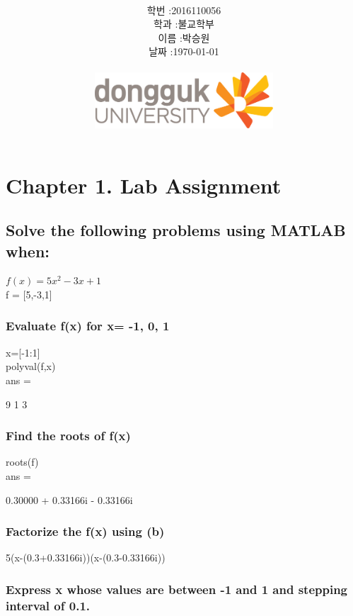 \documentclass[12pt,a4paper]{article}
\title{
	\centering
	\pgfornament[width=12cm,color=teal]{84}\\
	\vspace{1cm}
	\fontsize{50}{50} \selectfont {정보통신 수학 및 실습\\3월 3주차 Lab assignment}\\
		\pgfornament[width=12cm,color=teal]{88}\\
	\vfill}
\author{
	\LARGE
	\begin{tabular}{rl}
		\hline
		학번 : & 2016110056\\ 
		학과 : & 불교학부 \\
		이름 : & 박승원\\
		날짜 : & \today\\
		\hline
	\end{tabular}\vspace{1cm}
	\\
\includegraphics[width=0.5\textwidth]{logo.jpg}
	}
\date{}
\begin{document}
\maketitle
{}
\noindent
\lstset{language=matlab, columns=flexible, tabsize=4, frame=shadowbox, showstringspaces=false, breaklines=true, upquote=true, basicstyle=\normalsize}

\renewcommand{\thesubsubsection}{\alph{subsubsection})}
\renewcommand{\thesubsection}{\arabic{subsection}.}
\newpage
\section*{Chapter 1. Lab Assignment}

\subsection {Solve the following problems using MATLAB when:}
$f(x) = 5x^2-3x+1$\\
f = [5,-3,1]\\

\subsubsection{Evaluate f(x) for x= -1, 0, 1} 

x=[-1:1]\\
polyval(f,x)\\
ans =

9   1   3




\subsubsection{Find the roots of f(x)} 

roots(f)\\
ans =

0.30000 + 0.33166i - 0.33166i


\subsubsection{Factorize the f(x) using (b)} 

5(x-(0.3+0.33166i))(x-(0.3-0.33166i))

\subsubsection{Express x whose values are between -1 and 1 and stepping interval of 0.1.} 
\end{document}
